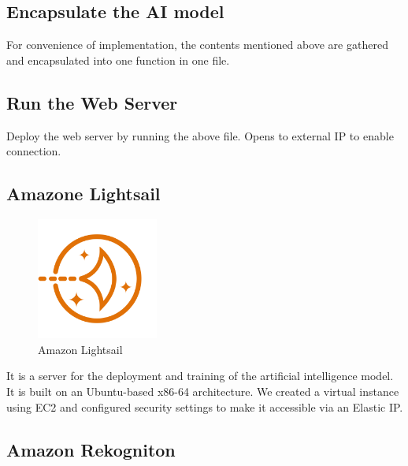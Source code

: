 \subsection{\textbf{Encapsulate the AI model}}
For convenience of implementation, the contents mentioned above are gathered and encapsulated into one function in one file.\\
\subsection{\textbf{Run the Web Server}}
Deploy the web server by running the above file. Opens to external IP to enable connection.\\

\subsection{\textbf{Amazone Lightsail}}

\begin{figure}[htp]
\centering
\includegraphics[width=4cm]{images/aws lightsail.png}
\caption{Amazon Lightsail}
\label{fig:aws}
\end{figure}

It is a server for the deployment and training of the artificial intelligence model. It is built on an Ubuntu-based x86-64 architecture. We created a virtual instance using EC2 and configured security settings to make it accessible via an Elastic IP.\\

\subsection{\textbf{Amazon Rekogniton}}

